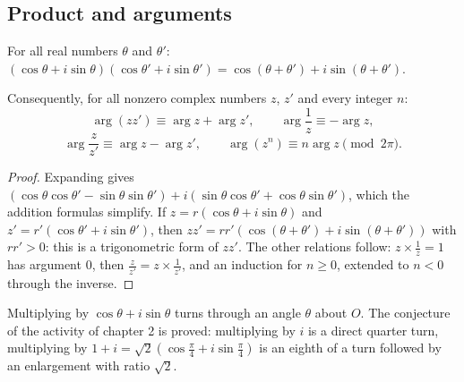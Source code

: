 \subsection{Product and arguments}
\begin{theorem}
For all real numbers $\theta$ and $\theta'$: $(\cos\theta+i\sin\theta)(\cos\theta'+i\sin\theta')=\cos(\theta+\theta')+i\sin(\theta+\theta')$.\par
Consequently, for all nonzero complex numbers $z$, $z'$ and every integer $n$:
\[\arg(zz')\equiv\arg z+\arg z',\qquad\arg\frac1z\equiv-\arg z,\]
\[\arg\frac z{z'}\equiv\arg z-\arg z',\qquad\arg\left(z^n\right)\equiv n\arg z\pmod{2\pi}.\]
\end{theorem}
\begin{proof}
Expanding gives $(\cos\theta\cos\theta'-\sin\theta\sin\theta')+i(\sin\theta\cos\theta'+\cos\theta\sin\theta')$, which the addition formulas simplify. If $z=r(\cos\theta+i\sin\theta)$ and $z'=r'(\cos\theta'+i\sin\theta')$, then $zz'=rr'(\cos(\theta+\theta')+i\sin(\theta+\theta'))$ with $rr'>0$: this is a trigonometric form of $zz'$. The other relations follow: $z\times\frac1z=1$ has argument $0$, then $\frac z{z'}=z\times\frac1{z'}$, and an induction for $n\ge0$, extended to $n<0$ through the inverse.
\end{proof}
\begin{keypoint}[Interpretation]
Multiplying by $\cos\theta+i\sin\theta$ turns through an angle $\theta$ about $O$. The conjecture of the activity of chapter 2 is proved: multiplying by $i$ is a direct quarter turn, multiplying by $1+i=\sqrt2\left(\cos\frac\pi4+i\sin\frac\pi4\right)$ is an eighth of a turn followed by an enlargement with ratio $\sqrt2$.
\end{keypoint}

